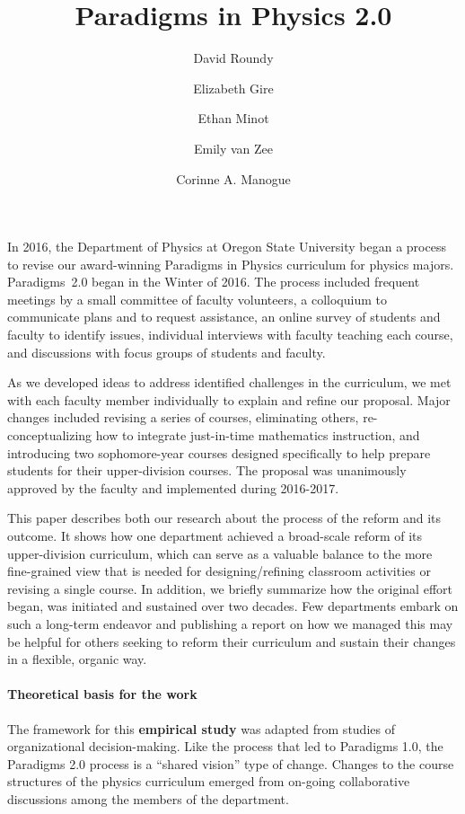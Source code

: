 \documentclass[aps,prstper,reprint]{revtex4-1}
\begin{document}
\title{Paradigms in Physics 2.0}
\author{David Roundy}
\author{Elizabeth Gire}
\author{Ethan Minot}
\author{Emily van Zee}
\author{Corinne A. Manogue}


\maketitle

In 2016, the Department of Physics at Oregon State University began a
process to revise our award-winning Paradigms in Physics curriculum for physics
majors. Paradigms~2.0 began in the Winter of 2016. The process included frequent meetings by a small committee of faculty volunteers, a colloquium to communicate plans and to request assistance, an online survey of students and faculty to identify issues, individual interviews with faculty teaching each course, and discussions with focus groups of students and faculty. 

As we developed ideas to address identified challenges in the curriculum, we met with each faculty member individually to explain and refine our proposal. Major changes included revising a series of courses, eliminating others, re-conceptualizing how to integrate just-in-time mathematics instruction, and introducing two sophomore-year courses designed specifically to help prepare students for their upper-division courses. The proposal was unanimously approved by the faculty and implemented during 2016-2017. 

This paper describes both our research about the process of the reform and its
outcome. It shows how one department achieved a broad-scale reform of its upper-division curriculum, which can serve as a valuable balance to the more fine-grained view that is needed for designing/refining classroom activities or revising a single course.  In addition, we briefly summarize how the original effort began\cite{manogue2001paradigms,manogue2003paradigms}, was initiated and sustained over  two decades\cite{vanzeeHistory}. Few departments embark on such a long-term endeavor and publishing a report on how we managed this may be helpful for others seeking to reform their curriculum and sustain their changes in a flexible, organic way.

\paragraph*{Theoretical basis for the work}
The framework for this {\bf empirical study} was adapted from studies
of organizational decision-making\cite{beach2006leadership}.  Like the
process that led to Paradigms 1.0, the Paradigms 2.0 process is a
``shared vision'' type of change\cite{henderson2010}. Changes to the
course structures of the physics curriculum emerged from on-going collaborative discussions among the members of the department. 
\end{document}
